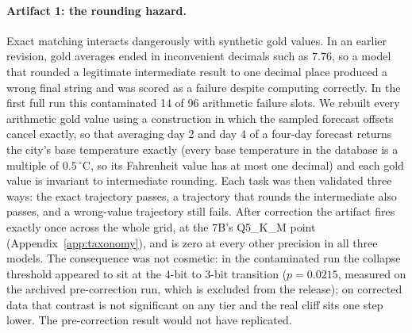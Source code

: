 \documentclass[11pt]{article}
\begin{document}
\paragraph{Artifact 1: the rounding hazard.} Exact matching interacts dangerously with synthetic gold values. In an earlier revision, gold averages ended in inconvenient decimals such as $7.76$, so a model that rounded a legitimate intermediate result to one decimal place produced a wrong final string and was scored as a failure despite computing correctly. In the first full run this contaminated 14 of 96 arithmetic failure slots. We rebuilt every arithmetic gold value using a construction in which the sampled forecast offsets cancel exactly, so that averaging day 2 and day 4 of a four-day forecast returns the city's base temperature exactly (every base temperature in the database is a multiple of $0.5\,^{\circ}$C, so its Fahrenheit value has at most one decimal) and each gold value is invariant to intermediate rounding. Each task was then validated three ways: the exact trajectory passes, a trajectory that rounds the intermediate also passes, and a wrong-value trajectory still fails. After correction the artifact fires exactly once across the whole grid, at the 7B's Q5\_K\_M point (Appendix~\ref{app:taxonomy}), and is zero at every other precision in all three models. The consequence was not cosmetic: in the contaminated run the collapse threshold appeared to sit at the 4-bit to 3-bit transition ($p=0.0215$, measured on the archived pre-correction run, which is excluded from the release); on corrected data that contrast is not significant on any tier and the real cliff sits one step lower. The pre-correction result would not have replicated.
\end{document}
